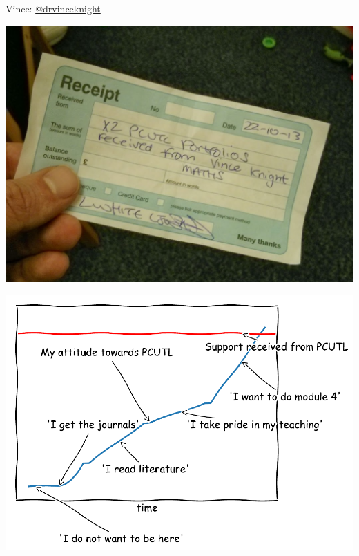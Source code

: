 \documentclass{beamer}
\begin{document}
    \begin{frame}
        \begin{center}
            \Large
               Vince: \href{https://twitter.com/drvinceknight}{@drvinceknight}\\
        \end{center}
    \end{frame}

    \begin{frame}
        \begin{center}
            \includegraphics[width=.8\textwidth]{../2015-07-22-My-experience-of-pcutl/pcutl.jpg}
        \end{center}
    \end{frame}

    \begin{frame}
        \begin{center}
            \includegraphics[width=.8\textwidth]{./assets/xkcd_pcutl.pdf}
        \end{center}
    \end{frame}
\end{document}
